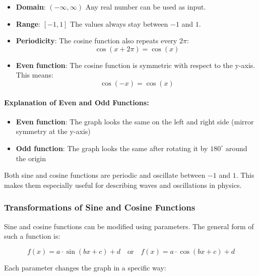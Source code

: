 \begin{itemize}
    \item \textbf{Domain}: $(-\infty, \infty)$  
    Any real number can be used as input.

    \item \textbf{Range}: $[-1,1]$  
    The values always stay between $-1$ and $1$.

    \item \textbf{Periodicity}:  
    The cosine function also repeats every $2\pi$:
    \begin{equation}
        \cos(x + 2\pi) = \cos(x)
    \end{equation}
    \item \textbf{Even function}:  
    The cosine function is symmetric with respect to the y-axis. This means:
    \begin{equation}
        \cos(-x) = \cos(x)
    \end{equation}

\end{itemize}

\paragraph{Explanation of Even and Odd Functions:}
\begin{itemize}
    \item \textbf{Even function}: The graph looks the same on the left and right side (mirror symmetry at the y-axis)
    \item \textbf{Odd function}: The graph looks the same after rotating it by $180^\circ$ around the origin
\end{itemize}
Both sine and cosine functions are periodic and oscillate between $-1$ and $1$. This makes them especially useful for describing waves and oscillations in physics.

\subsubsection{Transformations of Sine and Cosine Functions}

Sine and cosine functions can be modified using parameters. The general form of such a function is:

\begin{equation}
    f(x) = a \cdot \sin(bx + c) + d \quad \text{or} \quad f(x) = a \cdot \cos(bx + c) + d
\end{equation}

Each parameter changes the graph in a specific way:

